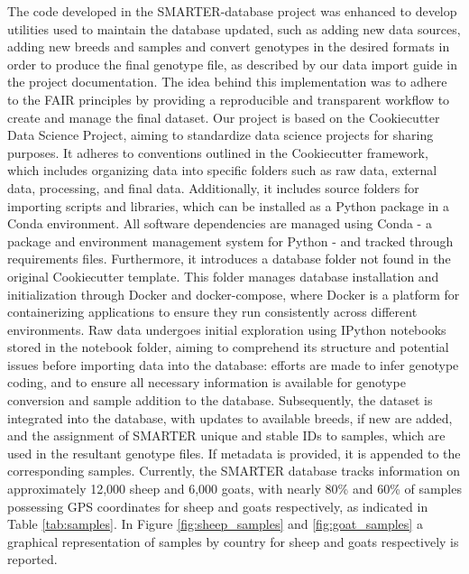 \documentclass[a4paper,num-refs,gigabyte]{oup-contemporary}
\begin{document}
The code developed in the SMARTER-database project was enhanced to develop utilities used to maintain the database updated, such as adding new data sources, adding new breeds and samples and convert genotypes in the desired formats in order to produce the final genotype file, as described by our data import guide\citep{DataImportProcess} in the project documentation. The idea behind this implementation was to adhere to the FAIR principles\citep{Wilkinson2016} by providing a reproducible and transparent workflow to create and manage the final dataset.
Our project is based on the Cookiecutter Data Science Project\citep{CookiecutterDataScience}, aiming to standardize data science projects for sharing purposes. It adheres to conventions outlined in the Cookiecutter framework\citep{Cookiecutter}, which includes organizing data into specific folders such as raw data, external data, processing, and final data. Additionally, it includes source folders for importing scripts and libraries, which can be installed as a Python package in a Conda\citep{Anaconda} environment. All software dependencies are managed using Conda - a package and environment management system for Python - and tracked through requirements files. Furthermore, it introduces a database folder not found in the original Cookiecutter template. This folder manages database installation and initialization through Docker\citep{Docker} and docker-compose\citep{DockerCompose}, where Docker is a platform for containerizing applications to ensure they run consistently across different environments.
Raw data undergoes initial exploration using IPython notebooks stored in the notebook folder, aiming to comprehend its structure and potential issues before importing data into the database: efforts are made to infer genotype coding, and to ensure all necessary information is available for genotype conversion and sample addition to the database. Subsequently, the dataset is integrated into the database, with updates to available breeds, if new are added, and the assignment of SMARTER unique and stable IDs to samples, which are used in the resultant genotype files. If metadata is provided, it is appended to the corresponding samples. Currently, the SMARTER database tracks information on approximately 12,000 sheep and 6,000 goats, with nearly 80\% and 60\% of samples possessing GPS coordinates for sheep and goats respectively, as indicated in Table \ref{tab:samples}. In Figure \ref{fig:sheep_samples} and \ref{fig:goat_samples} a graphical representation of samples by country for sheep and goats respectively is reported.
\end{document}
